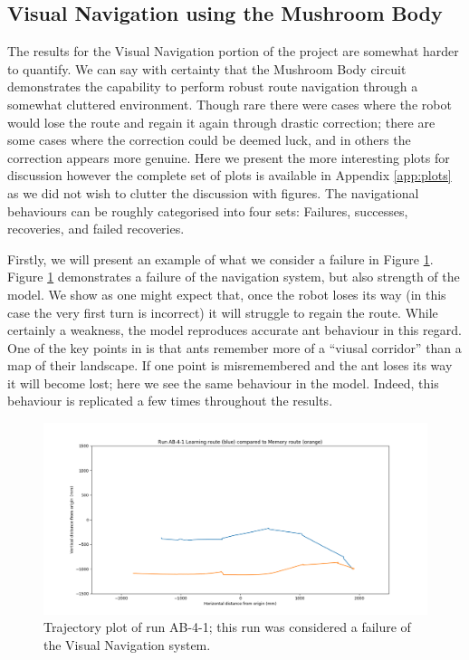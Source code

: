 \documentclass[a4paper,12pt]{article}
\begin{document}
\subsection{Visual Navigation using the Mushroom Body}
The results for the Visual Navigation portion of the project are somewhat harder to quantify. We can say with certainty that the Mushroom Body circuit
demonstrates the capability to perform robust route navigation through a somewhat cluttered environment. Though rare there were cases where the robot would
lose the route and regain it again through drastic correction; there are some cases where the correction could be deemed luck, and in others the correction
appears more genuine. Here we present the more interesting plots for discussion however the complete set of plots is available in Appendix \ref{app:plots} as we did not wish to clutter the discussion with figures. The navigational behaviours can be roughly categorised into four sets: Failures, successes, recoveries, and failed recoveries.
\newline

Firstly, we will present an example of what we consider a failure in Figure \ref{fig:ab-4-1-fail}. Figure \ref{fig:ab-4-1-fail}
demonstrates a failure of the navigation system, but also strength of the model. We show as one might expect that, once the
robot loses its way (in this case the very first turn is incorrect) it will struggle to regain the route. While certainly a
weakness, the model reproduces accurate ant behaviour in this regard. One of the key points in \cite{Wehner2006} is that
ants remember more of a ``viusal corridor'' than a map of their landscape. If one point is misremembered and the ant loses
its way it will become lost; here we see the same behaviour in the model. Indeed, this behaviour is replicated a few times
throughout the results.

\begin{figure}
 \centering
  \includegraphics[width=\textwidth]{AB-4-1}
  \caption{
    \label{fig:ab-4-1-fail} Trajectory plot of run AB-4-1; this run was considered a failure of the
    Visual Navigation system.
  }
\end{figure}
\end{document}
